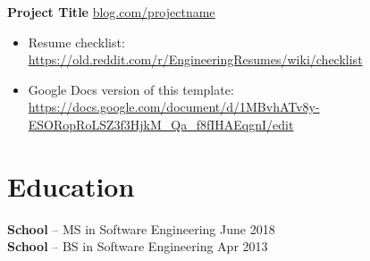 \documentclass[11pt]{article}       %
\begin{document}
\textbf{Project Title} \hfill \href{https://www.hardwareishard.net/portfolio-database}{blog.com/projectname} \\
\vspace{-9pt}
\begin{itemize}
  \item Resume checklist: \url{https://old.reddit.com/r/EngineeringResumes/wiki/checklist}
  \item Google Docs version of this template: \url{https://docs.google.com/document/d/1MBvhATv8y-ESORopRoLSZ3f3HjkM_Qa_f8fIHAEqgnI/edit}
\end{itemize}


\vspace{-18.5pt}

\section*{Education}
\textbf{School} -- MS in Software Engineering \hfill June 2018 \\
\textbf{School} -- BS in Software Engineering \hfill Apr 2013
\end{document}
